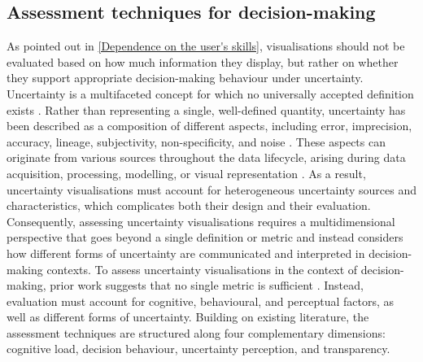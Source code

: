 \documentclass[final,journal,a4paper]{IEEEtran}
\begin{document}
\subsection{Assessment techniques for decision-making} \label{Assessment techniques for decision-making}
As pointed out in \ref{Dependence on the user's skills}, visualisations should not be evaluated based on how much information they display, but rather on whether they support appropriate decision-making behaviour under uncertainty. Uncertainty is a multifaceted concept for which no universally accepted definition exists \cite{GrietheSchumann}. Rather than representing a single, well-defined quantity, uncertainty has been described as a composition of different aspects, including error, imprecision, accuracy, lineage, subjectivity, non-specificity, and noise \cite{GrietheSchumann}. These aspects can originate from various sources throughout the data lifecycle, arising during data acquisition, processing, modelling, or visual representation \cite{GrietheSchumann}. As a result, uncertainty visualisations must account for heterogeneous uncertainty sources and characteristics, which complicates both their design and their evaluation. Consequently, assessing uncertainty visualisations requires a multidimensional perspective that goes beyond a single definition or metric and instead considers how different forms of uncertainty are communicated and interpreted in decision-making contexts. To assess uncertainty visualisations in the context of decision-making, prior work suggests that no single metric is sufficient \cite{Langer2022, Brennen2018}. Instead, evaluation must account for cognitive, behavioural, and perceptual factors, as well as different forms of uncertainty. Building on existing literature, the assessment techniques are structured along four complementary dimensions: cognitive load, decision behaviour, uncertainty perception, and transparency.
\end{document}

